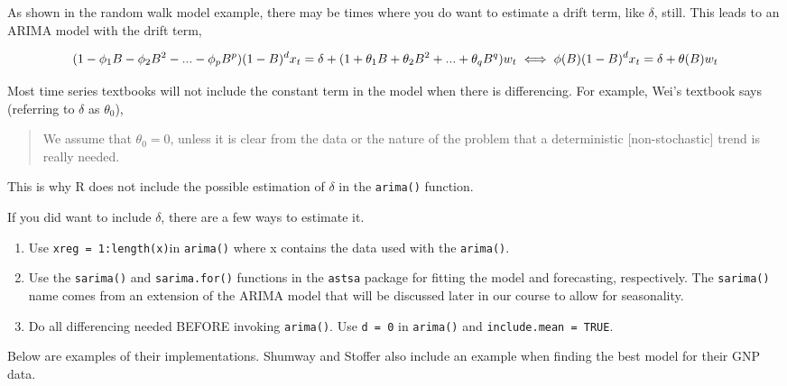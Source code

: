 \documentclass[
]{book}
\providecommand{\tightlist}{%
  \setlength{\itemsep}{0pt}\setlength{\parskip}{0pt}}
\theoremstyle{definition}
\theoremstyle{definition}
\theoremstyle{definition}
\theoremstyle{definition}
\theoremstyle{remark}
\begin{document}
As shown in the random walk model example, there may be times where you do want to estimate a drift term, like \(\delta\), still. This leads to an ARIMA model with the drift term,

\[(1-\phi_1B-\phi_2B^2-...-\phi_pB^p)(1-B)^dx_t=\\
\delta+(1+\theta_1B+\theta_2B^2+...+\theta_qB^q)w_t\\
\iff \phi(B)(1-B)^dx_t=\delta+\theta(B)w_t\]

Most time series textbooks will not include the constant term in the model when there is differencing. For example, Wei's textbook says (referring to \(\delta\) as \(\theta_0\)),

\begin{quote}
We assume that \(\theta_0 = 0\), unless it is clear from the data or the nature of the problem that a deterministic {[}non-stochastic{]} trend is really needed.
\end{quote}

This is why R does not include the possible estimation of \(\delta\) in the \texttt{arima()} function.

If you did want to include \(\delta\), there are a few ways to estimate it.

\begin{enumerate}
\def\labelenumi{\arabic{enumi}.}
\tightlist
\item
  Use \texttt{xreg\ =\ 1:length(x)}in \texttt{arima()} where x contains the data used with the \texttt{arima()}.\\
\item
  Use the \texttt{sarima()} and \texttt{sarima.for()} functions in the \texttt{astsa} package for fitting the model and forecasting, respectively. The \texttt{sarima()} name comes from an extension of the ARIMA model that will be discussed later in our course to allow for seasonality.
\item
  Do all differencing needed BEFORE invoking \texttt{arima()}. Use \texttt{d\ =\ 0} in \texttt{arima()} and \texttt{include.mean\ =\ TRUE}.
\end{enumerate}

Below are examples of their implementations. Shumway and Stoffer also include an example when finding the best model for their GNP data.
\end{document}
